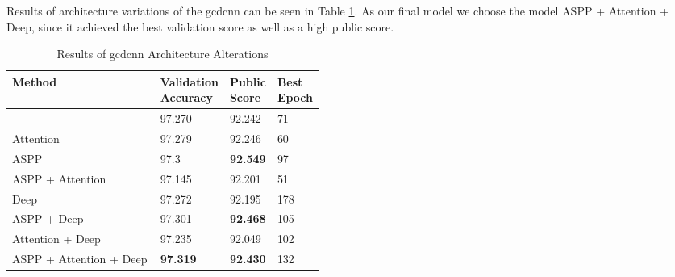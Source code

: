 Results of architecture variations of the \acrshort{gcdcnn} can be seen in Table \ref{tab:gcdcnn_tuning}. As our final model we choose the model ASPP + Attention + Deep, since it achieved the best validation score as well as a high public score.

\begin{table}[h!]
    \centering
    \begin{tabular}{l|p{0.15\linewidth}|p{0.15\linewidth}|p{0.15\linewidth}}
         Method & Validation Accuracy & Public Score & Best Epoch  \\ \hline
         - & 97.270 & 92.242 & 71 \\ %
         Attention & 97.279 & 92.246 & 60 \\ %
         ASPP & 97.3 & \textbf{92.549} & 97 \\ %
         ASPP + Attention & 97.145 & 92.201 & 51 \\ %
         Deep & 97.272 & 92.195 & 178 \\ %
         ASPP + Deep & 97.301 & \textbf{92.468} & 105 \\ %
         Attention + Deep & 97.235  & 92.049 & 102  \\ %
         ASPP + Attention + Deep & \textbf{97.319} & \textbf{92.430} & 132 \\ %
    \end{tabular}
    \caption{Results of \acrshort{gcdcnn} Architecture Alterations}
    \label{tab:gcdcnn_tuning}
\end{table}


